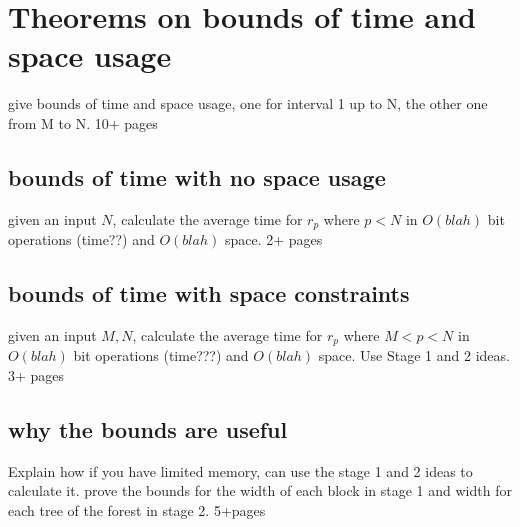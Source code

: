 \section{Theorems on bounds of time and space usage}
give bounds of time and space usage, one for interval 1 up to N, the other one from M to N. 10+ pages
\subsection{bounds of time with no space usage}
given an input $N$, calculate the average time for $r_p$ where $p<N$ in $O(blah)$ bit operations (time??) and $O(blah)$ space. 2+ pages
\subsection{bounds of time with space constraints}
given an input $M,N$, calculate the average time for $r_p$ where $M<p<N$ in $O(blah)$ bit operations (time???) and $O(blah)$ space. Use Stage 1 and 2 ideas. 3+ pages 
\subsection{why the bounds are useful}
Explain how if you have limited memory, can use the stage 1 and 2 ideas to calculate it. prove the bounds for the width of each block in stage 1 and width for each tree of the forest in stage 2. 5+pages 